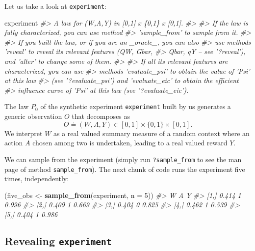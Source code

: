 \documentclass[11pt,openright,twoside]{book}
\newenvironment{Shaded}{\begin{snugshade}}{\end{snugshade}}
\newcommand{\CommentTok}[1]{\textcolor[rgb]{0.56,0.35,0.01}{\textit{#1}}}
\newcommand{\DataTypeTok}[1]{\textcolor[rgb]{0.13,0.29,0.53}{#1}}
\newcommand{\DecValTok}[1]{\textcolor[rgb]{0.00,0.00,0.81}{#1}}
\newcommand{\KeywordTok}[1]{\textcolor[rgb]{0.13,0.29,0.53}{\textbf{#1}}}
\newcommand{\NormalTok}[1]{#1}
\newcommand{\StringTok}[1]{\textcolor[rgb]{0.31,0.60,0.02}{#1}}
\newcommand{\defq}{\doteq}
\theoremstyle{definition}
\theoremstyle{definition}
\theoremstyle{definition}
\theoremstyle{remark}
\begin{document}
Let us take a look at \texttt{experiment}:

\begin{Shaded}
\begin{Highlighting}[]
\NormalTok{experiment}
\CommentTok{#> A law for (W,A,Y) in [0,1] x \{0,1\} x [0,1].}
\CommentTok{#> }
\CommentTok{#> If the law is fully characterized, you can use method}
\CommentTok{#> 'sample_from' to sample from it.}
\CommentTok{#> }
\CommentTok{#> If you built the law, or if you are an _oracle_, you can also}
\CommentTok{#> use methods 'reveal' to reveal its relevant features (QW, Gbar,}
\CommentTok{#> Qbar, qY -- see '?reveal'), and 'alter' to change some of them.}
\CommentTok{#> }
\CommentTok{#> If all its relevant features are characterized, you can use}
\CommentTok{#> methods 'evaluate_psi' to obtain the value of 'Psi' at this law}
\CommentTok{#> (see '?evaluate_psi') and 'evaluate_eic' to obtain the efficient}
\CommentTok{#> influence curve of 'Psi' at this law (see '?evaluate_eic').}
\end{Highlighting}
\end{Shaded}

The law \(P_{0}\) of the synthetic experiment \texttt{experiment} built by us generates
a generic observation \(O\) that decomposes as \begin{equation*} O \defq (W, A,
Y) \in [0,1] \times \{0,1\} \times [0,1].  \end{equation*} We interpret \(W\) as
a real valued summary measure of a random context where an action \(A\) chosen
among two is undertaken, leading to a real valued reward \(Y\).

We can sample from the experiment (simply run \texttt{?sample\_from} to see the man
page of method \texttt{sample\_from}). The next chunk of code runs the experiment five
times, independently:

\begin{Shaded}
\begin{Highlighting}[]
\NormalTok{(five_obs <-}\StringTok{ }\KeywordTok{sample_from}\NormalTok{(experiment, }\DataTypeTok{n =} \DecValTok{5}\NormalTok{))}
\CommentTok{#>          W A     Y}
\CommentTok{#> [1,] 0.414 1 0.996}
\CommentTok{#> [2,] 0.409 1 0.669}
\CommentTok{#> [3,] 0.404 0 0.825}
\CommentTok{#> [4,] 0.462 1 0.539}
\CommentTok{#> [5,] 0.404 1 0.986}
\end{Highlighting}
\end{Shaded}

\hypertarget{revealing-experiment}{%
\subsection{\texorpdfstring{Revealing \texttt{experiment}}{Revealing experiment}}\label{revealing-experiment}}
\end{document}

